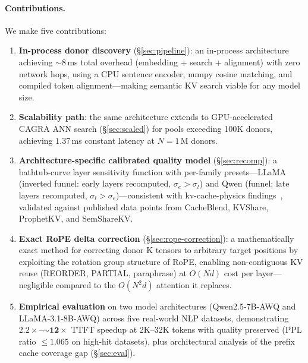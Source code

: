\documentclass[10pt,twocolumn]{article}
\begin{document}
\paragraph{Contributions.}
We make five contributions:
\begin{enumerate}[leftmargin=*,nosep]
\item \textbf{In-process donor discovery} (\S\ref{sec:pipeline}): an
  in-process architecture achieving ${\sim}8$\,ms total overhead
  (embedding + search + alignment) with zero network hops, using a
  CPU sentence encoder, numpy cosine matching, and compiled token
  alignment---making semantic KV search viable for any model size.

\item \textbf{Scalability path}: the same architecture extends to
  GPU-accelerated CAGRA ANN search (\S\ref{sec:scaled}) for pools
  exceeding 100K donors, achieving $\mathbf{1.37}$\,ms constant
  latency at $N{=}1$\,M donors.

\item \textbf{Architecture-specific calibrated quality model}
  (\S\ref{sec:recomp}): a bathtub-curve layer sensitivity function
  with per-family presets---LLaMA (inverted funnel: early layers
  recomputed, $\sigma_e{>}\sigma_l$) and Qwen (funnel: late layers
  recomputed, $\sigma_l{>}\sigma_e$)---consistent with kv-cache-physics
  findings~\cite{kvphysics}, validated against published data points
  from CacheBlend, KVShare, ProphetKV, and SemShareKV.

\item \textbf{Exact RoPE delta correction} (\S\ref{sec:rope-correction}):
  a mathematically exact method for correcting donor K tensors to
  arbitrary target positions by exploiting the rotation group structure
  of RoPE, enabling non-contiguous KV reuse (REORDER, PARTIAL,
  paraphrase) at $O(Nd)$ cost per layer---negligible compared to the
  $O(N^2 d)$ attention it replaces.

\item \textbf{Empirical evaluation} on two model architectures
  (Qwen2.5-7B-AWQ and LLaMA-3.1-8B-AWQ) across five real-world NLP
  datasets, demonstrating $2.2\times$--$\mathbf{{\sim}12\times}$ TTFT speedup at
  2K--32K tokens with quality preserved (PPL ratio ${\leq}1.065$ on
  high-hit datasets), plus architectural analysis
  of the prefix cache coverage gap (\S\ref{sec:eval}).
\end{enumerate}

\end{document}
